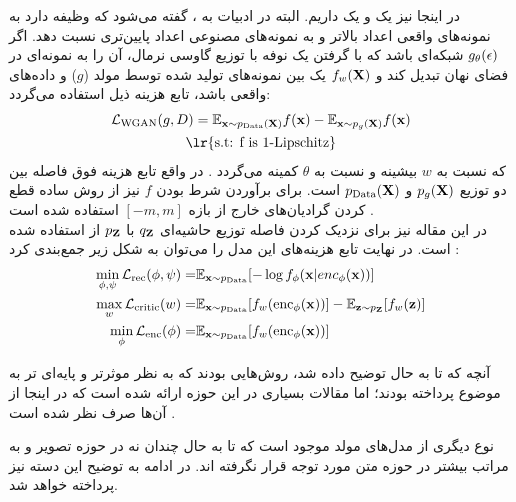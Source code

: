 در اینجا نیز یک \generator{} و یک \discriminator{} داریم. البته در ادبیات \wgan{} به \discriminator{}،
گفته می‌شود که وظیفه دارد به نمونه‌های واقعی اعداد بالاتر و به نمونه‌های مصنوعی اعداد پایین‌تری نسبت دهد.
اگر $g_\theta({\bf \epsilon})$ شبکه‌ای باشد که با گرفتن یک نوفه با توزیع گاوسی نرمال، آن را به نمونه‌ای در فضای نهان تبدیل کند و $f_w({\bf X})$ یک \critic{} بین نمونه‌های تولید شده توسط مولد ($g$) و داده‌های واقعی باشد، تابع هزینه ذیل استفاده می‌گردد:
\begin{gather}
	\mathcal{L}_\text{WGAN} (g, D)=
	\expected_{\bff{x} \sim p_\text{Data}(\bff{X})} f(\bff{x})
	- \expected_{\bff{x} \sim p_g(\bff{X})} f(\bff{x})
	\\
	\text{\lr{s.t: f is 1-Lipschitz}} \nonumber
\end{gather}
که نسبت به $w$ بیشینه و نسبت به $\theta$ کمینه می‌گردد \cite{wgan}. در واقع تابع هزینه فوق فاصله \wasser{} بین دو توزیع $p_g({\bf X})$ و $p_\text{Data}({\bf X})$ است. برای برآوردن شرط  بودن $f$ نیز از روش ساده قطع کردن گرادیان‌های خارج از بازه $[-m, m]$ استفاده شده است \cite{wae_text_reg}.
\\
در این مقاله نیز برای نزدیک کردن فاصله توزیع حاشیه‌ای $q_{\bf Z}$ با $p_{\bf Z}$ از \wgan{} استفاده شده است. در نهایت تابع هزینه‌های این مدل را می‌توان به شکل زیر جمع‌بندی کرد \cite{wae_text_reg}:
\begin{align}
	\min_{\phi, \psi} {\mathcal{L}}_\text{rec}(\phi, \psi) = & \mathbb E_{{\bf x} \sim p_\text{Data}} [- \log f_\phi({\bf x}|enc_\phi({\bf x}))] \nonumber
	\\
	\max_{w} {\mathcal{L}}_\text{critic}(w) =                &
	\mathbb E_{{\bf x} \sim p_\text{Data}} [f_w(\text{enc}_\phi({\bf x}))]
	-\mathbb E_{{\bf z} \sim p_{\bf Z}} [f_w({\bf z})] \nonumber
	\\
	\min_{\phi} {\mathcal{L}}_\text{enc}(\phi) =                   &
	\mathbb E_{{\bf x} \sim p_\text{Data}} [f_w(\text{enc}_\phi({\bf x}))]
\end{align}


آنچه که تا به حال توضیح داده شد، روش‌هایی بودند که به نظر موثرتر و پایه‌ای تر به موضوع پرداخته بودند؛ اما مقالات بسیاری در این حوزه ارائه شده است که در اینجا از آن‌ها صرف نظر شده است \cite{vae_decflow, vae_hybrid, vae_multilevel, vae_spherical}.

نوع دیگری از مدل‌های مولد موجود است که تا به حال چندان نه در حوزه تصویر و به مراتب بیشتر در حوزه متن مورد توجه قرار نگرفته اند. در ادامه به توضیح این دسته نیز پرداخته خواهد شد.

